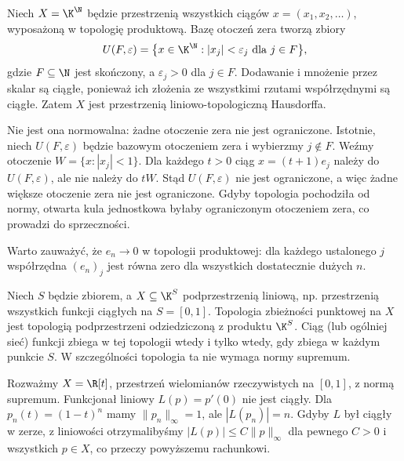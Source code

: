 \begin{przyklad}\label{ex:product-tvs}
Niech $X=\K^{\N}$ będzie przestrzenią wszystkich ciągów
$x=(x_1,x_2,\ldots)$, wyposażoną w topologię produktową.
Bazę otoczeń zera tworzą zbiory
\[
 U(F,\varepsilon)=\big\{x\in\K^{\N}:|x_j|<\varepsilon_j
          \text{ dla }j\in F\big\},
\]
gdzie $F\subseteq\N$ jest skończony, a $\varepsilon_j>0$ dla
$j\in F$. Dodawanie i mnożenie przez skalar są ciągłe,
ponieważ ich złożenia ze wszystkimi rzutami współrzędnymi
są ciągłe. Zatem $X$ jest przestrzenią liniowo-topologiczną Hausdorffa.

Nie jest ona normowalna: żadne otoczenie zera nie jest ograniczone.
Istotnie, niech $U(F,\varepsilon)$ będzie bazowym otoczeniem
zera i wybierzmy $j\notin F$. Weźmy otoczenie
$W=\{x:|x_j|<1\}$. Dla każdego $t>0$ ciąg
$x=(t+1)e_j$ należy do $U(F,\varepsilon)$, ale nie należy
do $tW$. Stąd $U(F,\varepsilon)$ nie jest ograniczone,
a więc żadne większe otoczenie zera nie jest ograniczone.
Gdyby topologia pochodziła od normy, otwarta kula jednostkowa
byłaby ograniczonym otoczeniem zera, co prowadzi do sprzeczności.

Warto zauważyć, że $e_n\to0$ w topologii produktowej:
dla każdego ustalonego $j$ współrzędna $(e_n)_j$
jest równa zero dla wszystkich dostatecznie dużych $n$.
\end{przyklad}

\begin{przyklad}
Niech $S$ będzie zbiorem, a $X\subseteq\K^S$ podprzestrzenią
liniową, np. przestrzenią wszystkich funkcji ciągłych na
$S=[0,1]$. Topologia zbieżności punktowej na $X$
jest topologią podprzestrzeni odziedziczoną z produktu
$\K^S$. Ciąg (lub ogólniej sieć) funkcji zbiega w tej
topologii wtedy i tylko wtedy, gdy zbiega w każdym punkcie $S$.
W szczególności topologia ta nie wymaga normy supremum.
\end{przyklad}

\begin{przyklad}
Rozważmy $X=\R[t]$, przestrzeń wielomianów rzeczywistych
na $[0,1]$, z normą supremum. Funkcjonał liniowy
$L(p)=p'(0)$ nie jest ciągły. Dla $p_n(t)=(1-t)^n$
mamy $\|p_n\|_\infty=1$, ale $|L(p_n)|=n$.
Gdyby $L$ był ciągły w zerze, z liniowości otrzymalibyśmy
$|L(p)|\leq C\|p\|_\infty$ dla pewnego $C>0$ i wszystkich
$p\in X$, co przeczy powyższemu rachunkowi.
\end{przyklad}

